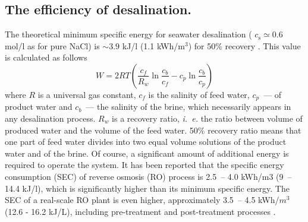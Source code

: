 \documentclass[journal,article,submit,pdftex,moreauthors]{Definitions/mdpi}
\newcommand{\ie}{\textit{i.~e.} }
\newcommand{\cs}{c_{\mathrm{s}}}
\begin{document}
\subsection{The efficiency of desalination.}
The theoretical minimum specific energy for seawater desalination (
$\cs\simeq0.6$ mol/l as for pure NaCl) is $\sim3.9$ kJ/l (1.1 kWh/m$^3$) for 50\% recovery \cite{Wang_2020}.
This value is calculated as follows 
\begin{equation}
W=2RT\left(\frac{c_{f}}{R_{w}}\ln\frac{c_{b}}{c_{f}}-c_{p}\ln\frac{c_{b}}{c_{p}}\right)
\label{eq:SEC}
\end{equation}
where $R$ is a universal gas constant, $c_{f}$ is the salinity of feed water, $c_p$~--- of product water and $c_b$~--- the salinity of the brine, which necessarily appears in any desalination process. 
$R_{w}$ is a recovery ratio, \ie the ratio between volume of produced water and the volume of the feed water. 
50\% recovery ratio means that one part of feed water divides into two equal volume solutions of the product water and of the brine.
Of course, a significant amount of additional energy is required to operate the system\cite{Kim_2019}. 
It has been reported that the specific energy consumption (SEC) of reverse osmosis (RO) process is 2.5~-- 4.0 kWh/m3 (9~-- 14.4 kJ/l), which is significantly higher than its minimum specific energy.
The SEC of a real-scale RO plant is even higher, approximately 3.5~-- 4.5 kWh/$m^{3}$ (12.6 - 16.2 kJ/L), including pre-treatment and post-treatment processes \cite{Kim_2018}. 
\end{document}

